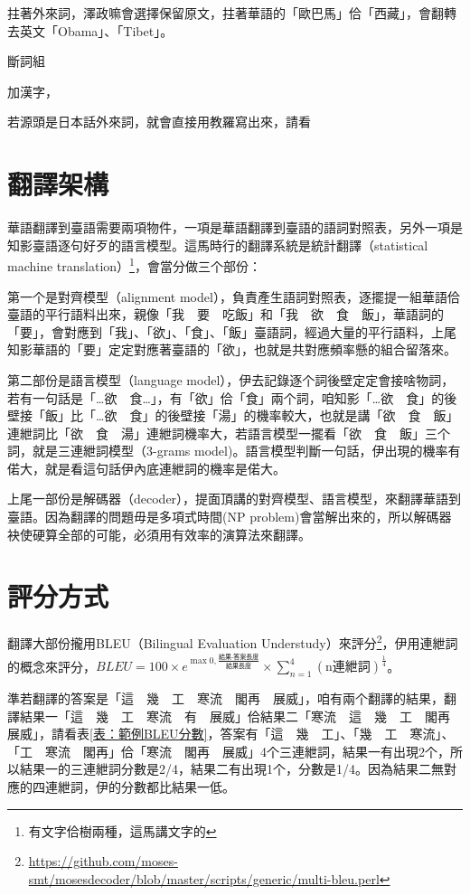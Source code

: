 \documentclass[final,oneside,onecolumn,12pt,a4paper]{book}%
\begin{document}
拄著外來詞，澤政嘛會選擇保留原文，拄著華語的「歐巴馬」佮「西藏」，會翻轉去英文「Obama」、「Tibet」。

斷詞組

加漢字，

若源頭是日本話外來詞，就會直接用教羅寫出來，請看

\section{翻譯架構}
\label{節：翻譯架構}
華語翻譯到臺語需要兩項物件，一項是華語翻譯到臺語的語詞對照表，另外一項是知影臺語逐句好歹的語言模型。這馬時行的翻譯系統是統計翻譯（statistical machine translation）\footnote{有文字佮樹兩種，這馬講文字的}，會當分做三个部份：

第一个是對齊模型（alignment model），負責產生語詞對照表，逐擺提一組華語佮臺語的平行語料出來，親像「我　要　吃飯」和「我　欲　食　飯」，華語詞的「要」，會對應到「我」、「欲」、「食」、「飯」臺語詞，經過大量的平行語料，上尾知影華語的「要」定定對應著臺語的「欲」，也就是共對應頻率懸的組合留落來。

第二部份是語言模型（language model），伊去記錄逐个詞後壁定定會接啥物詞，若有一句話是「…欲　食…」，有「欲」佮「食」兩个詞，咱知影「…欲　食」的後壁接「飯」比「…欲　食」的後壁接「湯」的機率較大，也就是講「欲　食　飯」連紲詞比「欲　食　湯」連紲詞機率大，若語言模型一擺看「欲　食　飯」三个詞，就是三連紲詞模型（3-grams model)。語言模型判斷一句話，伊出現的機率有偌大，就是看這句話伊內底連紲詞的機率是偌大。

上尾一部份是解碼器（decoder），提面頂講的對齊模型、語言模型，來翻譯華語到臺語。因為翻譯的問題毋是多項式時間(NP problem)會當解出來的，所以解碼器袂使硬算全部的可能，必須用有效率的演算法來翻譯。

\section{評分方式}
\label{節：評分方式}

翻譯大部份攏用BLEU（Bilingual Evaluation Understudy）來評分\footnote{\url{https://github.com/moses-smt/mosesdecoder/blob/master/scripts/generic/multi-bleu.perl}}，伊用連紲詞的概念來評分，$BLEU=100\times{e^{\max{0,\frac{\textit{結果-答案長度}}{\textit{結果長度}}}}}\times{\sum_{n=1}^{4}(\textrm{n連紲詞})^{\frac{1}{4}}}$。

準若翻譯的答案是「這　幾　工　寒流　閣再　展威」，咱有兩个翻譯的結果，翻譯結果一「這　幾　工　寒流　有　展威」佮結果二「寒流　這　幾　工　閣再　展威」，請看表\ref{表：範例BLEU分數}，答案有「這　幾　工」、「幾　工　寒流」、「工　寒流　閣再」佮「寒流　閣再　展威」4个三連紲詞，結果一有出現2个，所以結果一的三連紲詞分數是2/4，結果二有出現1个，分數是1/4。因為結果二無對應的四連紲詞，伊的分數都比結果一低。
\end{document}
